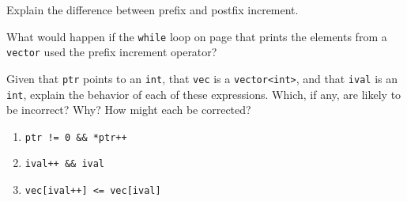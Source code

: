 %
%
\begin{question}
Explain the difference between prefix and postfix increment.
\end{question}

\begin{question}
What would happen if the \verb|while| loop on page \pageref{lst: use postfix increment to print the elements from a vector} that
prints the elements from a \verb|vector| used the prefix increment operator?
\end{question}

\begin{question}
Given that \verb|ptr| points to an \verb|int|, that \verb|vec| is a
\verb|vector<int>|, and that \verb|ival| is an \verb|int|, explain the behavior of each of
these expressions. Which, if any, are likely to be incorrect? Why? How might
each be corrected?
\begin{enumerate}[label=(\alph*)]
^^I\item \verb|ptr != 0 && *ptr++|
^^I\item \verb|ival++ && ival|
^^I\item \verb|vec[ival++] <= vec[ival]|
\end{enumerate}
\end{question}
